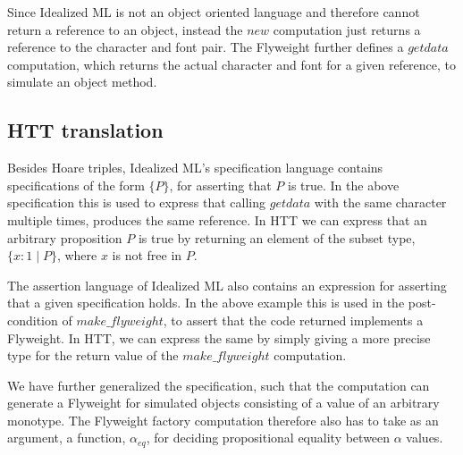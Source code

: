 \documentclass[a4paper,english]{article}
\begin{document}
Since Idealized ML is not an object oriented language and therefore cannot
return a reference to an object, instead the $new$ computation just returns a
reference to the character and font pair. The Flyweight further defines a
$getdata$ computation, which returns the actual character and font for a given
reference, to simulate an object method.

\subsection{HTT translation}

Besides Hoare triples, Idealized ML's specification language contains
specifications of the form $\{ P \}$, for asserting that $P$ is true. In the
above specification this is used to express that calling $getdata$ with the
same character multiple times, produces the same reference. In HTT we can
express that an arbitrary proposition $P$ is true by returning an element of
the subset type, $\{ x : 1 \mid P \}$, where $x$ is not free in $P$. 

The assertion language of Idealized ML also contains an expression for
asserting that a given specification holds. In the above example this is used
in the post-condition of $make\_flyweight$, to assert that the code returned
implements a Flyweight. In HTT, we can express the same by simply giving a more
precise type for the return value of the $make\_flyweight$ computation. 

We have further generalized the specification, such that the computation can
generate a Flyweight for simulated objects consisting of a value of an
arbitrary monotype. The Flyweight factory computation therefore also has to
take as an argument, a function, $\alpha_{eq}$, for deciding propositional
equality between $\alpha$ values. 
\end{document}
